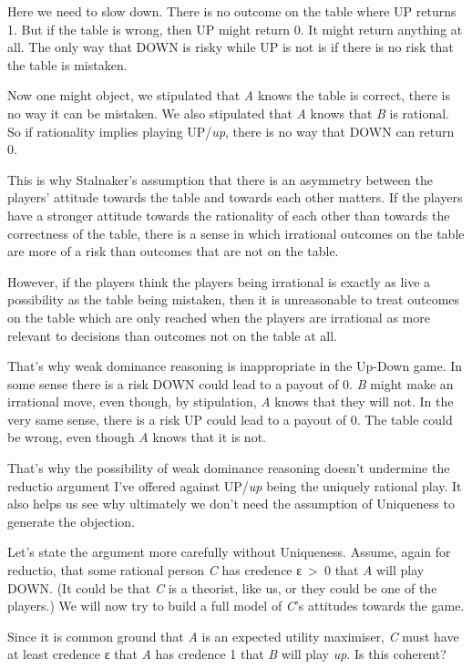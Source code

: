 \documentclass[
  10pt,
  letterpaper,
  twoside]{scrbook}
\begin{document}
Here we need to slow down. There is no outcome on the table where UP
returns 1. But if the table is wrong, then UP might return 0. It might
return anything at all. The only way that DOWN is risky while UP is not
is if there is no risk that the table is mistaken.

Now one might object, we stipulated that \emph{A} knows the table is
correct, there is no way it can be mistaken. We also stipulated that
\emph{A} knows that \emph{B} is rational. So if rationality implies
playing UP/\emph{up}, there is no way that DOWN can return 0.

This is why Stalnaker's assumption that there is an asymmetry between
the players' attitude towards the table and towards each other matters.
If the players have a stronger attitude towards the rationality of each
other than towards the correctness of the table, there is a sense in
which irrational outcomes on the table are more of a risk than outcomes
that are not on the table.

However, if the players think the players being irrational is exactly as
live a possibility as the table being mistaken, then it is unreasonable
to treat outcomes on the table which are only reached when the players
are irrational as more relevant to decisions than outcomes not on the
table at all.

That's why weak dominance reasoning is inappropriate in the Up-Down
game. In some sense there is a risk DOWN could lead to a payout of 0.
\emph{B} might make an irrational move, even though, by stipulation,
\emph{A} knows that they will not. In the very same sense, there is a
risk UP could lead to a payout of 0. The table could be wrong, even
though \emph{A} knows that it is not.

That's why the possibility of weak dominance reasoning doesn't undermine
the reductio argument I've offered against UP/\emph{up} being the
uniquely rational play. It also helps us see why ultimately we don't
need the assumption of Uniqueness to generate the objection.

Let's state the argument more carefully without Uniqueness. Assume,
again for reductio, that some rational person \emph{C} has credence
ε~\textgreater~0 that \emph{A} will play DOWN. (It could be that
\emph{C} is a theorist, like us, or they could be one of the players.)
We will now try to build a full model of \emph{C}'s attitudes towards
the game.

Since it is common ground that \emph{A} is an expected utility
maximiser, \emph{C} must have at least credence ε that \emph{A} has
credence 1 that \emph{B} will play \emph{up}. Is this coherent?
\end{document}
